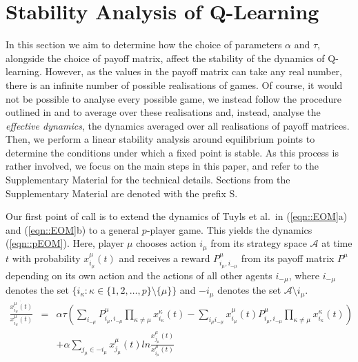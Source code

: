 \documentclass[sigconf,anonymous]{aamas}
\newcommand{\xmu}[2]{x_{#1_#2}^{#2}(t)}
\newcommand{\payoff}[2]{P^{#2}_{#1_#2, #1_{-#2}}}
\begin{document}

\section{Stability Analysis of Q-Learning} \label{sec::Theory}

In this section we aim to determine how the choice of parameters
$\alpha$ and $\tau$, alongside the choice of payoff matrix, affect the
stability of the dynamics of Q-learning. However, as the values in the
payoff matrix can take any real number, there is an infinite number
of possible realisations of games. Of course, it would not be possible
to analyse every possible game, we instead follow the procedure
outlined in \cite{Coolen2005} and \cite{Galla2013} to average over
these realisations and, instead, analyse the \textit{effective
  dynamics}, the dynamics averaged over all realisations of payoff
matrices. Then, we perform a linear stability analysis around
equilibrium points to determine the conditions under which a fixed
point is stable. As this process is rather involved, we focus on the main steps in this paper, and refer to the Supplementary Material for the technical details. Sections from the Supplementary Material are denoted with the prefix S.

Our first point of call is to extend the dynamics of Tuyls et al.~in
(\ref{eqn::EOM}a) and (\ref{eqn::EOM}b) to a general $p$-player
game. This yields the dynamics (\ref{eqn::pEOM}). Here, player $\mu$
chooses action $i_{\mu}$ from its strategy space $\mathcal{A}$ at time
$t$ with probability $\xmu{i}{\mu}$ and receives a reward
$\payoff{i}{\mu}$ from its payoff matrix $P^\mu$ depending on its own
action and the actions of all other agents $i_{-\mu}$, where $i_{-\mu}$ denotes the set $\{ i_\kappa : \kappa \in \{1, 2,
\ldots , p\} \setminus \{\mu\} \}$ and $-i_{\mu}$ denotes the set
$\mathcal{A} \setminus {i_\mu}$.
%
\begin{eqnarray}
    \frac{\dot{\xmu{i}{\mu}}}{\xmu{i}{\mu}} \! \! \! \! \! \! & = \! \! \! \! \! \! & \alpha \tau \left( \sum_{i_{-\mu}} \payoff{i}{\mu} \prod_{\kappa \neq \mu} \xmu{i}{\kappa} -  \sum_{i_\mu i_{-\mu}} \xmu{i}{\mu} \payoff{i}{\mu} \prod_{\kappa \neq \mu} \xmu{i}{\kappa} \right) \nonumber \\
    & & + \alpha \sum_{j_\mu \in -i_\mu} \xmu{j}{\mu} ln \frac{\xmu{j}{\mu}}{\xmu{i}{\mu}}     \label{eqn::pEOM}
\end{eqnarray}
\end{document}
